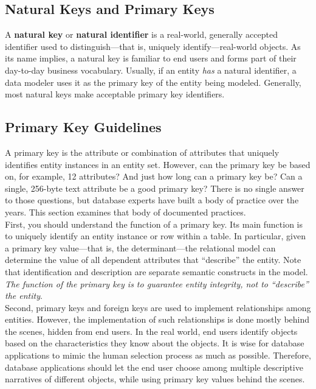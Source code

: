 \documentclass[a4paper, 12pt, titlepage]{report}
\begin{document}
{\subsection{Natural Keys and Primary Keys}
A \textbf{natural key} or \textbf{natural identifier} is a real-world, generally accepted identifier used to distinguish—that is, uniquely identify—real-world objects. As its name implies, a natural key is familiar to end users and forms part of their day-to-day business vocabulary. Usually, if an entity \emph{has} a natural identifier, a data modeler uses it as the primary key of the entity being modeled. Generally, most natural keys make acceptable primary key identifiers.
\subsection{Primary Key Guidelines}
A primary key is the attribute or combination of attributes that uniquely identifies entity instances in an entity set. However, can the primary key be based on, for example, 12 attributes? And just how long can a primary key be? Can a single, 256-byte text attribute be a good primary key? There is no single answer to those questions, but database experts have built a body of practice over the years. This section examines that body of documented practices.\\
First, you should understand the function of a primary key. Its main function is to uniquely identify an entity instance or row within a table. In particular, given a primary key value—that is, the determinant—the relational model can determine the value of all dependent attributes that “describe” the entity. Note that identification and description are separate semantic constructs in the model. \emph{The function of the primary key is to guarantee entity integrity, not to “describe” the entity}.\\
Second, primary keys and foreign keys are used to implement relationships among entities. However, the implementation of such relationships is done mostly behind the scenes, hidden from end users. In the real world, end users identify objects based on the characteristics they know about the objects. It is wise for database applications to mimic the human selection process as much as possible. Therefore, database applications should let the end user choose among multiple descriptive narratives of different objects, while using primary key values behind the scenes.
\pagebreak
\begin{center}
\begin{longtable}{ ||p{5cm} | p{9cm}|| }

\end{longtable}
\end{center}}
\end{document}
